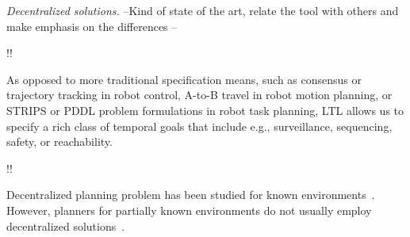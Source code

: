 \emph{Decentralized solutions.}
--Kind of state of the art, relate the tool with others and make emphasis on the differences --

!!

As opposed to more traditional specification means, such as consensus or trajectory tracking in robot control, A-to-B travel in robot motion planning, or STRIPS or PDDL problem formulations in robot task planning, LTL allows us to specify a rich class of temporal goals that include e.g., surveillance, sequencing, safety, or reachability.

!!

Decentralized planning problem has been studied for known environments~\cite{schillinger2016decomposition,guo2015multi,tumova2016multi}.
However, planners for partially known environments do not usually employ decentralized solutions~\cite{roy2006planning,du2012robot,diaz2001exploring}. 

